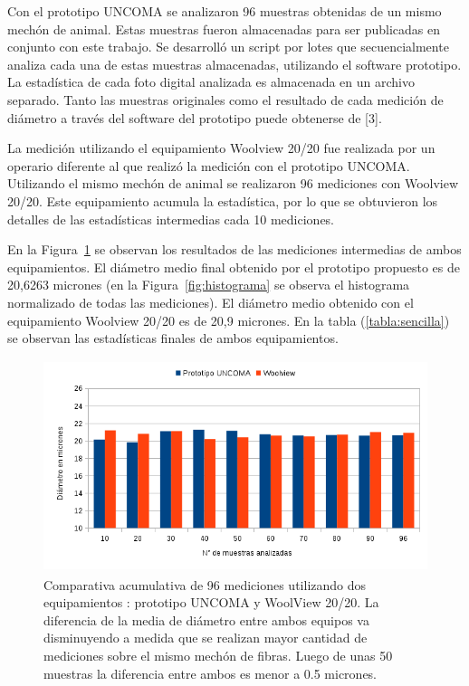 \documentclass[runningheads,a4paper]{llncs}
\begin{document}
Con el prototipo UNCOMA se analizaron 96 muestras obtenidas de un mismo mechón de animal. Estas muestras fueron almacenadas para ser publicadas en conjunto con este trabajo. Se desarrolló un script por lotes que secuencialmente analiza cada una de estas muestras almacenadas, utilizando el software prototipo. La estadística de cada foto digital analizada es almacenada en un archivo separado. Tanto las muestras originales como el resultado de cada medición de diámetro a través del software del prototipo puede obtenerse de [3].

La medición utilizando el equipamiento Woolview 20/20 fue realizada por un operario diferente al que realizó la medición con el prototipo UNCOMA. Utilizando el mismo mechón de animal se realizaron 96 mediciones con Woolview 20/20. Este equipamiento acumula la estadística, por lo que se obtuvieron los detalles de las estadísticas intermedias cada 10 mediciones. 

En la Figura~\ref{fig:prototipovswv} se observan los resultados de las mediciones intermedias de ambos equipamientos.
El diámetro medio final obtenido por el prototipo propuesto es de 20,6263 micrones (en la Figura~\ref{fig:histograma} se observa el histograma normalizado de todas las mediciones). El diámetro medio obtenido con el equipamiento Woolview 20/20 es de 20,9 micrones. En la tabla (\ref{tabla:sencilla}) se observan las estadísticas finales de ambos equipamientos.

\begin{figure}
\centering
\includegraphics[height=6.2cm]{prototipovswv}
\caption{Comparativa acumulativa de 96 mediciones utilizando dos equipamientos : prototipo UNCOMA y WoolView 20/20.
La diferencia de la media de diámetro entre ambos equipos va disminuyendo a medida que se realizan mayor cantidad de mediciones sobre el mismo mechón de fibras. Luego de unas 50 muestras la diferencia entre ambos es menor a 0.5 micrones.}
\label{fig:prototipovswv}
\end{figure}
\end{document}
